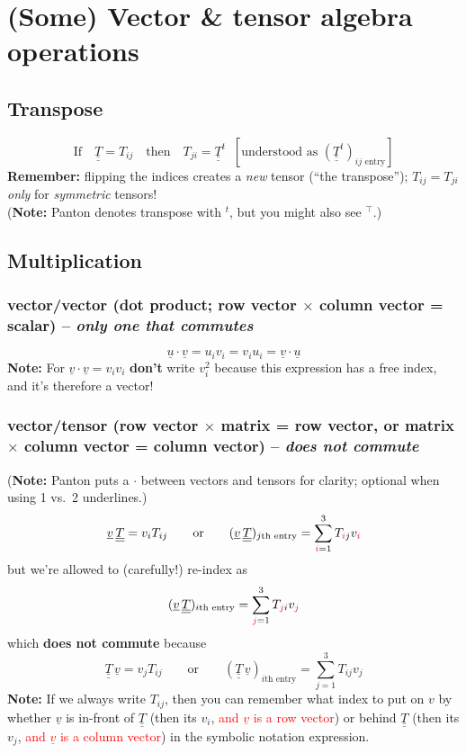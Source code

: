 \documentclass{article}
\begin{document}
\thispagestyle{fancy}

\section*{(Some) Vector \& tensor algebra operations}

\subsection{Transpose}
\[
	\text{If}\quad \underline{\underline{T}} = T_{ij}
	\quad\text{then}\quad
	T_{ji} = \underline{\underline{T}}^t \;\; \left[\text{understood as } (\underline{\underline{T}}^t)_{ij \text{ entry}} \right]
\]
\textbf{Remember:} flipping the indices creates a \emph{new} tensor (``the transpose''); $T_{ij} = T_{ji}$ \emph{only} for \emph{symmetric} tensors!\\
(\textbf{Note:} Panton denotes transpose with $^t$, but you might also see $^\top$.)

\subsection{Multiplication}

\subsubsection{vector/vector (dot product; row vector $\times$ column vector = scalar) -- \textit{only one that commutes}}
\[
	\underline{u}\cdot\underline{v} = u_i v_i = v_i u_i = \underline{v}\cdot\underline{u}
\]
\textbf{Note:} For $\underline{v}\cdot\underline{v}=v_iv_i$ \textbf{don't} write $v_i^2$ because this expression has a free index, and it's therefore a vector!

\subsubsection{vector/tensor (row vector $\times$ matrix = row vector, or matrix $\times$ column vector = column vector) -- \textit{does not commute}}
(\textbf{Note:} Panton puts a $\cdot$ between vectors and tensors for clarity; optional when using 1 vs.\ 2 underlines.)
\[
	\underline{v}\,\underline{\underline{T}} = v_i T_{ij}
	\qquad\text{or}\qquad
    (\underline{v}\,\underline{\underline{T}})_{j \text{th entry}} = \sum_{{\color{magenta}i}=1}^3 T_{{\color{magenta}i}j}v_{\color{magenta}i}
\]
but we're allowed to (carefully!) re-index as
\[
    (\underline{v}\,\underline{\underline{T}})_{i \text{th entry}} = \sum_{{\color{magenta}j}=1}^3 T_{{\color{magenta}j}i}v_{\color{magenta}j}
\]
which \textbf{does not commute} because
\[
    \underline{\underline{T}}\,\underline{v} = v_j T_{ij}
	\qquad\text{or}\qquad
    (\underline{\underline{T}}\,\underline{v})_{i \text{th entry}} = \sum_{j=1}^3 T_{ij}v_j
\]
\textbf{Note:} If we always write $T_{ij}$, then you can remember what index to put on $v$ by whether $\underline{v}$ is in-front of $\underline{\underline{T}}$ (then its $v_i$, \textcolor{red}{and $\underline{v}$ is a row vector}) or behind $\underline{\underline{T}}$ (then its $v_j$, \textcolor{red}{and $\underline{v}$ is a column vector}) in the symbolic notation expression.
\end{document}
